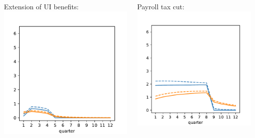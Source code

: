 \documentclass[pdflatex,aspectratio=169]{beamer}
\begin{document}
{\begin{frame}
\begin{columns}
              \begin{column}{0.33\textwidth}  	
                \footnotesize Extension of UI benefits:
                \includegraphics[width=1.2\linewidth]{Code/HA-Models/FromPandemicCode/Figures/recession_UI_relrecession} 
              \end{column}
              
              \begin{column}{0.33\textwidth}  
                \footnotesize Payroll tax cut:	
                \includegraphics[width=1.2\linewidth]{Code/HA-Models/FromPandemicCode/Figures/recession_taxcut_relrecession}
              \end{column}
            \end{columns}

          \end{frame}
        }{}
\end{document}
